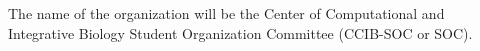 \subsection{} 

The name of the organization will be the Center of Computational and Integrative Biology Student Organization Committee (CCIB-SOC or SOC).